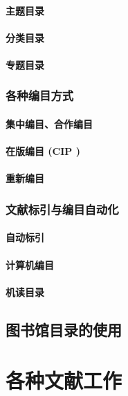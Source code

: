 \documentclass[UTF8]{../../ApplicationUniverse}
\begin{document}
            \paragraph{主题目录}
            \paragraph{分类目录}
            \paragraph{专题目录}
        \subsubsection{各种编目方式}
            \paragraph{集中编目、合作编目}
            \paragraph{在版编目 (CIP )}
            \paragraph{重新编目}
        \subsubsection{文献标引与编目自动化}
            \paragraph{自动标引}
            \paragraph{计算机编目}
            \paragraph{机读目录}
    \subsection{图书馆目录的使用}







\section{各种文献工作}
\end{document}
